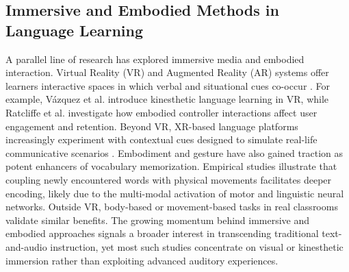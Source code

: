 \documentclass{ehissymp}
\begin{document}
\subsection{Immersive and Embodied Methods in Language Learning}
A parallel line of research has explored immersive media and embodied interaction. Virtual Reality (VR) and Augmented Reality (AR) systems offer learners interactive spaces in which verbal and situational cues co-occur \cite{Mizuho2023,Ebert2016}. For example, Vázquez et al. \cite{Vazquez2018} introduce kinesthetic language learning in VR, while Ratcliffe et al. \cite{Ratcliffe2021} investigate how embodied controller interactions affect user engagement and retention. Beyond VR, XR-based language platforms increasingly experiment with contextual cues designed to simulate real-life communicative scenarios \cite{Brubach2022,Li2022,Ogawa2020}.
Embodiment and gesture have also gained traction as potent enhancers of vocabulary memorization. Empirical studies \cite{Macedonia2011} illustrate that coupling newly encountered words with physical movements facilitates deeper encoding, likely due to the multi-modal activation of motor and linguistic neural networks. Outside VR, body-based or movement-based tasks in real classrooms \cite{Tellier2008,Zhang2020} validate similar benefits. The growing momentum behind immersive and embodied approaches signals a broader interest in transcending traditional text-and-audio instruction, yet most such studies concentrate on visual or kinesthetic immersion rather than exploiting advanced auditory experiences.
\end{document}
